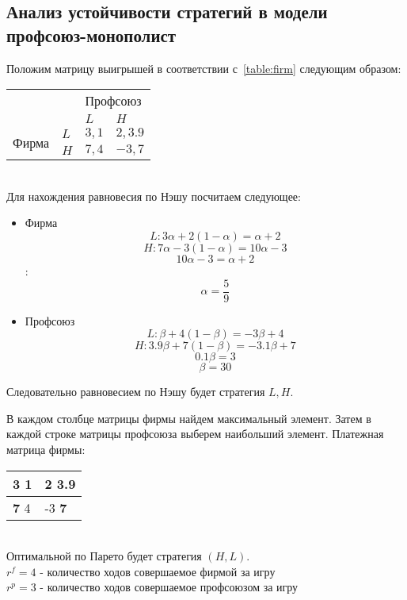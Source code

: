 \subsection{Анализ устойчивости стратегий в модели профсоюз-монополист}
Положим матрицу выигрышей в соответствии с~\ref{table:firm} следующим образом:
\begin{table}[h]
	
	\centering
	\begin{tabular}{|l|l|l|l|}
		\hline
		\multicolumn{2}{|l|}{\multirow{2}{*}{}} & \multicolumn{2}{l|}{Профсоюз} \\ \cline{3-4} 
		\multicolumn{2}{|l|}{}                  & $L$            & $H$            \\ \hline
		\multirow{2}{*}{Фирма}     & $L$     & $3, 1$          & $2, 3.9$          \\ \cline{2-4} 
		& $H$     & $7, 4$          & $-3, 7$          \\ \hline
	\end{tabular}
	
\end{table}\\
Для нахождения равновесия по Нэшу посчитаем следующее: 
\begin{itemize}
\item Фирма
	$$ L:  3\alpha + 2(1-\alpha)=\alpha + 2$$
	$$ H: 7\alpha - 3(1-\alpha)=10\alpha - 3$$
	$$10\alpha - 3 = \alpha+2 $$:
	$$\alpha = \frac{5}{9} $$
\item Профсоюз	
	 $$L: \beta + 4(1-\beta)=-3\beta + 4$$
	 $$H: 3.9\beta + 7(1-\beta)=-3.1\beta +7$$
	$$0.1\beta  = 3 $$
	$$\beta = 30 $$
	
	
\end{itemize}

Следовательно равновесием по Нэшу будет стратегия $L,H$.

В каждом столбце матрицы фирмы найдем максимальный элемент. 
Затем в каждой строке матрицы профсоюза выберем наибольший элемент.
Платежная матрица фирмы:\\
\begin{table}[h]
	\centering
	\begin{tabular}{|l|l|}
		\hline
		3 1 & \textbf{2 3.9}  \\ \hline
		\textbf{7} 4 & -3 \textbf{7} \\ \hline
	\end{tabular}
\end{table}\\
Оптимальной по Парето будет стратегия $(H,L)$.\\
$r^f= 4 $ - количество ходов совершаемое фирмой за игру\\
$r^p= 3 $ - количество ходов совершаемое профсоюзом за игру\\ \\

